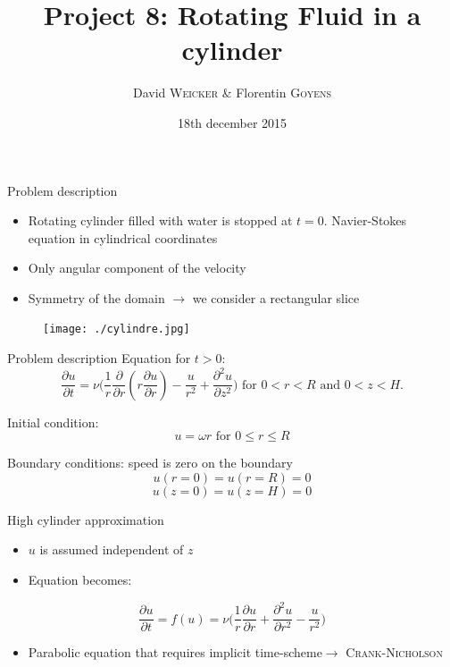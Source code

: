 \documentclass{beamer}
\title[Project SF2520]{Project 8: Rotating Fluid in a cylinder}
\author{David \textsc{Weicker} \& Florentin \textsc{Goyens} }
\institute{KTH}
\date{18th december 2015}
\newcommand{\dr}{\partial}
\begin{document}
\begin{frame}
\titlepage
\end{frame}


\begin{frame}{Problem description}

\begin{itemize}
\item Rotating cylinder filled with water is stopped at $t=0$. Navier-Stokes equation in cylindrical coordinates 
\item Only angular component of the velocity
\item Symmetry of the domain $\rightarrow$ we consider a rectangular slice 
\end{itemize}

\begin{figure}[!h]
\centering
\texttt{[image: ./cylindre.jpg]}
\end{figure}

\end{frame}

\begin{frame}{Problem description}
Equation for $t>0$:
$$\dfrac{\dr u}{\dr t}= \nu\Big(\frac{1}{r}\frac{\dr}{\dr r}(r\frac{\dr u}{\dr r}) - \frac{u}{r^2} + \frac{\dr^2 u}{\dr z^2}\Big) \text{ for } 0<r<R \text{ and } 0<z<H.$$

Initial condition: 
$$u = \omega r \text{ for } 0\leq r \leq R$$

Boundary conditions: speed is zero on the boundary
$$u(r = 0) = u(r = R) = 0$$
$$u(z=0)= u(z=H) = 0$$
\end{frame}

\begin{frame}{High cylinder approximation}
\begin{itemize}
\item $u$ is assumed independent of $z$
\item Equation becomes:
\end{itemize}
$$\dfrac{\dr u}{\dr t}= f(u)= \nu\Big(\frac{1}{r}\frac{\dr u}{\dr r} + \frac{\dr^2 u}{\dr r^2} - \frac{u}{r^2}\Big)$$
\begin{itemize}
\item Parabolic equation that requires implicit time-scheme\newline $\rightarrow$ \textsc{Crank-Nicholson}
\end{itemize}
\end{frame}
\end{document}
